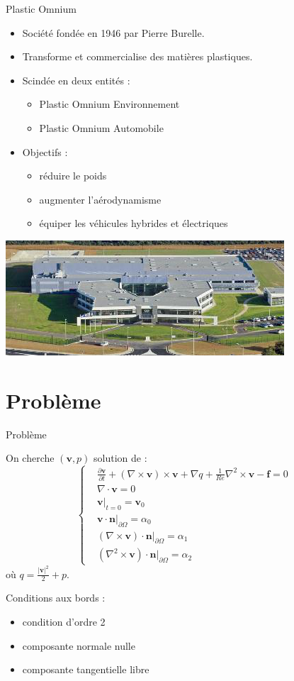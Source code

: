 \documentclass{beamer}
\newcommand{\grad}{{\nabla}}
\newcommand{\rot}{{\nabla\times}}
\newcommand{\rott}{{\nabla^2\times}}
\renewcommand{\div}{{\nabla\cdot}}
\newcommand{\restr}{{\big\rvert_{\partial\Omega}}}
\begin{document}
\begin{frame}{Plastic Omnium}
\begin{itemize}
\item Société fondée en 1946 par Pierre Burelle.
\item Transforme et commercialise des matières plastiques.
\item Scindée en deux entités :
\begin{itemize}
\item Plastic Omnium Environnement
\item Plastic Omnium Automobile
\end{itemize}
\item Objectifs :
\begin{itemize}
\item réduire le poids
\item augmenter l'aérodynamisme
\item équiper les véhicules hybrides et électriques
\end{itemize}
\end{itemize}
\centering
\includegraphics[scale=0.5]{sigma}
\end{frame}

\section{Problème}
\begin{frame}{Problème}
\begin{block}{On cherche $(\mathbf{v},p)$ solution de :}
\begin{equation}
\label{depart}
\left\{\begin{aligned}
&\frac{\partial \mathbf{v}}{\partial t} + (\rot  \mathbf{v})\times \mathbf{v} + \grad q + \frac{1}{Re}\rott  \mathbf{v}-\mathbf{f} = 0\\
&\div \mathbf{v} = 0\\
&\mathbf{v}\big\rvert_{t=0} = \mathbf{v}_0\\
&\mathbf{v}\cdot \mathbf{n}\restr = \alpha_0\\
&(\rot  \mathbf{v})\cdot \mathbf{n}\restr = \alpha_1\\
&(\rott  \mathbf{v})\cdot \mathbf{n}\restr = \alpha_2
\end{aligned}\right.
\end{equation}
où $q = \frac{|\mathbf{v}|^2}{2}+p$.
\end{block}
Conditions aux bords :
\begin{itemize}
\item condition d'ordre 2
\item composante normale nulle
\item composante tangentielle libre
\end{itemize}
\end{frame}
\end{document}
